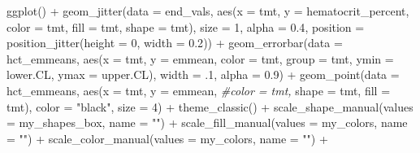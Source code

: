 \documentclass[
]{article}
\newenvironment{Shaded}{\begin{snugshade}}{\end{snugshade}}
\newcommand{\AttributeTok}[1]{\textcolor[rgb]{0.77,0.63,0.00}{#1}}
\newcommand{\CommentTok}[1]{\textcolor[rgb]{0.56,0.35,0.01}{\textit{#1}}}
\newcommand{\DecValTok}[1]{\textcolor[rgb]{0.00,0.00,0.81}{#1}}
\newcommand{\FloatTok}[1]{\textcolor[rgb]{0.00,0.00,0.81}{#1}}
\newcommand{\FunctionTok}[1]{\textcolor[rgb]{0.00,0.00,0.00}{#1}}
\newcommand{\NormalTok}[1]{#1}
\newcommand{\SpecialCharTok}[1]{\textcolor[rgb]{0.00,0.00,0.00}{#1}}
\newcommand{\StringTok}[1]{\textcolor[rgb]{0.31,0.60,0.02}{#1}}
\begin{document}
\begin{Shaded}
\begin{Highlighting}[]
\FunctionTok{ggplot}\NormalTok{() }\SpecialCharTok{+}
  \FunctionTok{geom\_jitter}\NormalTok{(}\AttributeTok{data =}\NormalTok{ end\_vals,}
              \FunctionTok{aes}\NormalTok{(}\AttributeTok{x =}\NormalTok{ tmt,}
                   \AttributeTok{y =}\NormalTok{ hematocrit\_percent, }
                   \AttributeTok{color =}\NormalTok{ tmt,}
                 \AttributeTok{fill =}\NormalTok{ tmt,}
                 \AttributeTok{shape =}\NormalTok{ tmt), }
               \AttributeTok{size =} \DecValTok{1}\NormalTok{,}
              \AttributeTok{alpha =} \FloatTok{0.4}\NormalTok{,}
              \AttributeTok{position =} \FunctionTok{position\_jitter}\NormalTok{(}\AttributeTok{height =} \DecValTok{0}\NormalTok{, }\AttributeTok{width =} \FloatTok{0.2}\NormalTok{)) }\SpecialCharTok{+}
  \FunctionTok{geom\_errorbar}\NormalTok{(}\AttributeTok{data =}\NormalTok{ hct\_emmeans,}
                \FunctionTok{aes}\NormalTok{(}\AttributeTok{x =}\NormalTok{ tmt,}
                    \AttributeTok{y =}\NormalTok{ emmean, }
                    \AttributeTok{color =}\NormalTok{ tmt,}
                    \AttributeTok{group =}\NormalTok{ tmt,}
                    \AttributeTok{ymin =}\NormalTok{ lower.CL, }
                    \AttributeTok{ymax =}\NormalTok{ upper.CL),}
                \AttributeTok{width =}\NormalTok{ .}\DecValTok{1}\NormalTok{,}
                \AttributeTok{alpha =} \FloatTok{0.9}\NormalTok{) }\SpecialCharTok{+}
  \FunctionTok{geom\_point}\NormalTok{(}\AttributeTok{data =}\NormalTok{ hct\_emmeans, }
             \FunctionTok{aes}\NormalTok{(}\AttributeTok{x =}\NormalTok{ tmt,}
                   \AttributeTok{y =}\NormalTok{ emmean, }
                   \CommentTok{\#color = tmt,}
                 \AttributeTok{shape =}\NormalTok{ tmt,}
                 \AttributeTok{fill =}\NormalTok{ tmt), }
             \AttributeTok{color =} \StringTok{"black"}\NormalTok{,}
               \AttributeTok{size =} \DecValTok{4}\NormalTok{) }\SpecialCharTok{+}
  \FunctionTok{theme\_classic}\NormalTok{() }\SpecialCharTok{+} 
  \FunctionTok{scale\_shape\_manual}\NormalTok{(}\AttributeTok{values =}\NormalTok{ my\_shapes\_box, }\AttributeTok{name =} \StringTok{""}\NormalTok{) }\SpecialCharTok{+}
  \FunctionTok{scale\_fill\_manual}\NormalTok{(}\AttributeTok{values =}\NormalTok{ my\_colors, }\AttributeTok{name =} \StringTok{""}\NormalTok{) }\SpecialCharTok{+}
  \FunctionTok{scale\_color\_manual}\NormalTok{(}\AttributeTok{values =}\NormalTok{ my\_colors, }\AttributeTok{name =} \StringTok{""}\NormalTok{) }\SpecialCharTok{+}

\end{Highlighting}
\end{Shaded}
\end{document}
